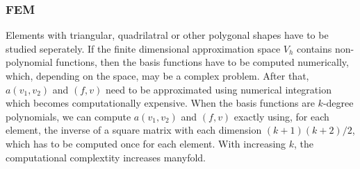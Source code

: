 \documentclass{beamer}
\begin{document}
\begin{frame}
\frametitle{FEM}
Elements with triangular, quadrilatral or other polygonal shapes have to be studied seperately.
\linebreak\linebreak
If the finite dimensional approximation space $V_h$ contains non-polynomial functions, then the basis functions have to be computed numerically, which, depending on the space, may be a complex problem.
\linebreak After that, $a(v_1,v_2)$ and $(f,v)$ need to be approximated using numerical integration which becomes computationally expensive.
\linebreak\linebreak
When the basis functions are $k$-degree polynomials, we can compute $a(v_1,v_2)$ and $(f,v)$ exactly using, for each element, the inverse of a square matrix with each dimension $(k+1)(k+2)/2$, which has to be computed once for each element. With increasing $k$, the computational complextity increases manyfold.
\end{frame}
\end{document}
